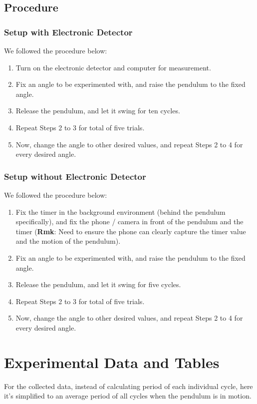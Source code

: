 \documentclass{article}
\begin{document}
\subsection{Procedure}
\subsubsection{Setup with Electronic Detector}
We followed the procedure below:
\begin{enumerate}
    \item Turn on the electronic detector and computer for measurement.
    \item Fix an angle to be experimented with, and raise the pendulum to the fixed angle.
    \item Release the pendulum, and let it swing for ten cycles.
    \item Repeat Steps 2 to 3 for total of five trials.
    \item Now, change the angle to other desired values, and repeat Steps 2 to 4 for every desired angle.
\end{enumerate}

\subsubsection{Setup without Electronic Detector}
We followed the procedure below:
\begin{enumerate}
    \item Fix the timer in the background environment (behind the pendulum specifically), and fix the phone / camera in front of the pendulum and the timer (\textbf{Rmk}: Need to ensure the phone can clearly capture the timer value and the motion of the pendulum).
    \item Fix an angle to be experimented with, and raise the pendulum to the fixed angle.
    \item Release the pendulum, and let it swing for five cycles.
    \item Repeat Steps 2 to 3 for total of five trials.
    \item Now, change the angle to other desired values, and repeat Steps 2 to 4 for every desired angle.
\end{enumerate}

\newpage

\section{Experimental Data and Tables}
For the collected data, instead of calculating period of each individual cycle, here it's simplified to an average period of all cycles when the pendulum is in motion.
\end{document}
